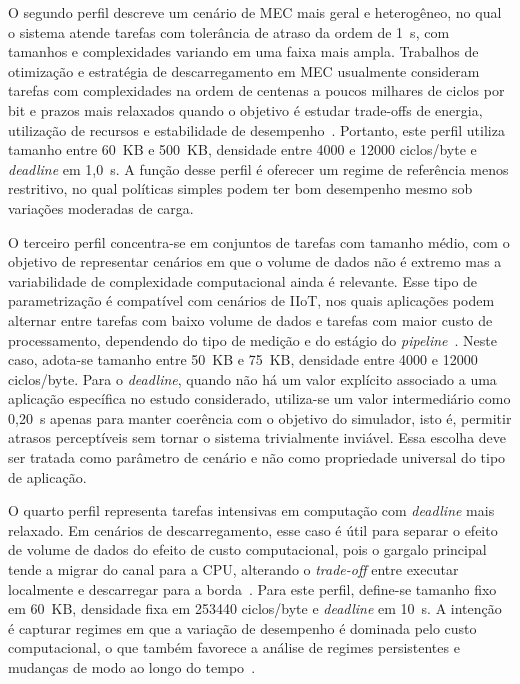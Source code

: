 O segundo perfil descreve um cenário de \gls{MEC} mais geral e heterogêneo, no qual o sistema atende tarefas com tolerância de atraso da ordem de 1~s, com tamanhos e complexidades variando em uma faixa mais ampla. Trabalhos de otimização e estratégia de descarregamento em \gls{MEC} usualmente consideram tarefas com complexidades na ordem de centenas a poucos milhares de ciclos por bit e prazos mais relaxados quando o objetivo é estudar trade-offs de energia, utilização de recursos e estabilidade de desempenho~\cite{akbari2022drl_os_sensors,hao2021risk_sensitive_iiot_jwcn}. Portanto, este perfil utiliza tamanho entre 60~KB e 500~KB, densidade entre 4000 e 12000 ciclos/byte e \textit{deadline} em 1{,}0~s. A função desse perfil é oferecer um regime de referência menos restritivo, no qual políticas simples podem ter bom desempenho mesmo sob variações moderadas de carga.

O terceiro perfil concentra-se em conjuntos de tarefas com tamanho médio, com o objetivo de representar cenários em que o volume de dados não é extremo mas a variabilidade de complexidade computacional ainda é relevante. Esse tipo de parametrização é compatível com cenários de IIoT, nos quais aplicações podem alternar entre tarefas com baixo volume de dados e tarefas com maior custo de processamento, dependendo do tipo de medição e do estágio do \textit{pipeline}~\cite{yang2019industrial_iiot_ieee_network,hao2021risk_sensitive_iiot_jwcn}. Neste caso, adota-se tamanho entre 50~KB e 75~KB, densidade entre 4000 e 12000 ciclos/byte. Para o \textit{deadline}, quando não há um valor explícito associado a uma aplicação específica no estudo considerado, utiliza-se um valor intermediário como 0{,}20~s apenas para manter coerência com o objetivo do simulador, isto é, permitir atrasos perceptíveis sem tornar o sistema trivialmente inviável. Essa escolha deve ser tratada como parâmetro de cenário e não como propriedade universal do tipo de aplicação.

O quarto perfil representa tarefas intensivas em computação com \textit{deadline} mais relaxado. Em cenários de descarregamento, esse caso é útil para separar o efeito de volume de dados do efeito de custo computacional, pois o gargalo principal tende a migrar do canal para a \gls{CPU}, alterando o \textit{trade-off} entre executar localmente e descarregar para a borda~\cite{akbari2022drl_os_sensors}. Para este perfil, define-se tamanho fixo em 60~KB, densidade fixa em 253440 ciclos/byte e \textit{deadline} em 10~s. A intenção é capturar regimes em que a variação de desempenho é dominada pelo custo computacional, o que também favorece a análise de regimes persistentes e mudanças de modo ao longo do tempo~\cite{limnios2001semi_markov_reliability}.

